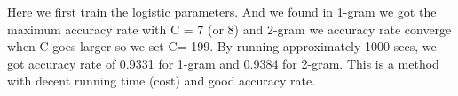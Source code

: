
Here we first train the logistic parameters. And we found in 1-gram we got the maximum accuracy rate with C = 7 (or 8) and 2-gram we accuracy rate converge when C goes larger so we set C= 199. By running approximately 1000 secs, we got accuracy rate of 0.9331 for 1-gram and 0.9384 for 2-gram. This is a method with decent running time (cost) and  good accuracy rate. \\